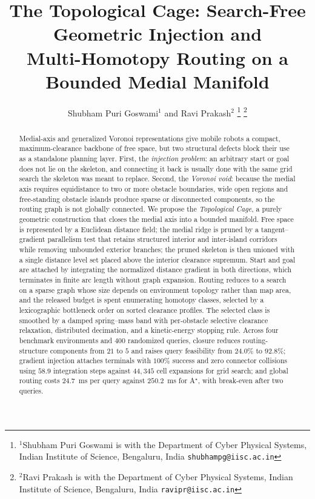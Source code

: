 \documentclass[conference]{IEEEtran}
\begin{document}
\title{\LARGE \bf
The Topological Cage: Search-Free Geometric Injection and \\
Multi-Homotopy Routing on a Bounded Medial Manifold
}
\author{Shubham Puri Goswami$^{1}$ and Ravi Prakash$^{2}$%
\thanks{$^{1}$Shubham Puri Goswami is with the Department of Cyber Physical Systems, Indian Institute of Science, Bengaluru, India {\tt\small shubhampg@iisc.ac.in}}%
\thanks{$^{2}$Ravi Prakash is with the Department of Cyber Physical Systems, Indian Institute of Science, Bengaluru, India {\tt\small ravipr@iisc.ac.in}}%
}
\maketitle
\thispagestyle{empty}
\pagestyle{empty}
\begin{abstract}
Medial-axis and generalized Voronoi representations give mobile robots a compact, maximum-clearance backbone of free space, but two structural defects block their use as a standalone planning layer. First, the \emph{injection problem}: an arbitrary start or goal does not lie on the skeleton, and connecting it back is usually done with the same grid search the skeleton was meant to replace. Second, the \emph{Voronoi void}: because the medial axis requires equidistance to two or more obstacle boundaries, wide open regions and free-standing obstacle islands produce sparse or disconnected components, so the routing graph is not globally connected.
We propose the \emph{Topological Cage}, a purely geometric construction that closes the medial axis into a bounded manifold. Free space is represented by a Euclidean distance field; the medial ridge is pruned by a tangent--gradient parallelism test that retains structured interior and inter-island corridors while removing unbounded exterior branches; the pruned skeleton is then unioned with a single distance level set placed above the interior clearance supremum. Start and goal are attached by integrating the normalized distance gradient in both directions, which terminates in finite arc length without graph expansion. Routing reduces to a search on a sparse graph whose size depends on environment topology rather than map area, and the released budget is spent enumerating homotopy classes, selected by a lexicographic bottleneck order on sorted clearance profiles. The selected class is smoothed by a damped spring--mass band with per-obstacle selective clearance relaxation, distributed decimation, and a kinetic-energy stopping rule. Across four benchmark environments and $400$ randomized queries, closure reduces routing-structure components from $21$ to $5$ and raises query feasibility from $24.0\%$ to $92.8\%$; gradient injection attaches terminals with $100\%$ success and zero connector collisions using $58.9$ integration steps against $44{,}345$ cell expansions for grid search; and global routing costs $24.7$~ms per query against $250.2$~ms for A$^\star$, with break-even after two queries.
\end{abstract}
\end{document}
